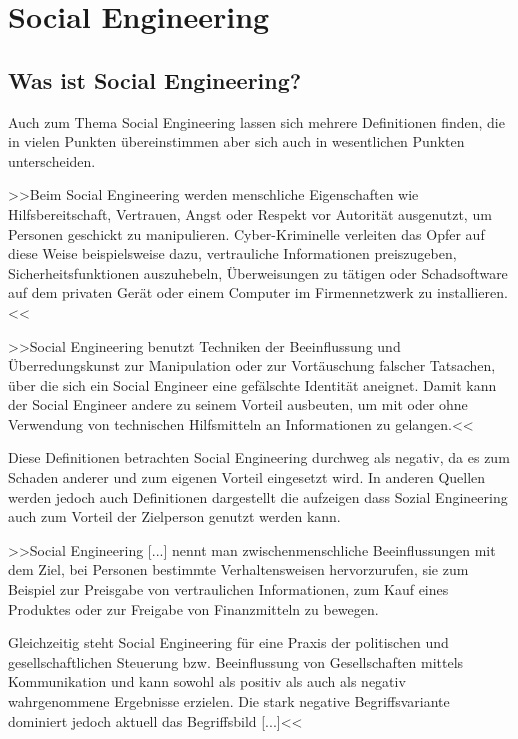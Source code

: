 \chapter{Social Engineering}\label{ch:SocialEngineering}



\section{Was ist Social Engineering?}

Auch zum Thema Social Engineering lassen sich mehrere Definitionen finden, die in vielen Punkten übereinstimmen aber sich auch in wesentlichen Punkten unterscheiden. 

>>Beim Social Engineering werden menschliche Eigenschaften wie Hilfsbereitschaft, Vertrauen, Angst oder Respekt vor Autorität ausgenutzt, um Personen geschickt zu manipulieren. Cyber-Kriminelle verleiten das Opfer auf diese Weise beispielsweise dazu, vertrauliche Informationen preiszugeben, Sicherheitsfunktionen auszuhebeln, Überweisungen zu tätigen oder Schadsoftware auf dem privaten Gerät oder einem Computer im Firmennetzwerk zu installieren.<<\cite{bsi}

>>Social Engineering benutzt Techniken der Beeinflussung und Überredungskunst zur Manipulation oder zur Vortäuschung falscher Tatsachen, über die sich ein Social Engineer eine gefälschte Identität aneignet. Damit kann der Social Engineer andere zu seinem Vorteil ausbeuten, um mit oder ohne Verwendung von technischen Hilfsmitteln an Informationen zu gelangen.<<\cite{mitn}

Diese Definitionen betrachten Social Engineering durchweg als negativ, da es zum Schaden anderer und zum eigenen Vorteil eingesetzt wird. In anderen Quellen werden jedoch auch Definitionen dargestellt die aufzeigen dass Sozial Engineering auch zum Vorteil der Zielperson genutzt werden kann.

>>Social Engineering [...] nennt man zwischenmenschliche Beeinflussungen mit dem Ziel, bei Personen bestimmte Verhaltensweisen hervorzurufen, sie zum Beispiel zur Preisgabe von vertraulichen Informationen, zum Kauf eines Produktes oder zur Freigabe von Finanzmitteln zu bewegen.

Gleichzeitig steht Social Engineering für eine Praxis der politischen und gesellschaftlichen Steuerung bzw. Beeinflussung von Gesellschaften mittels Kommunikation und kann sowohl als positiv als auch als negativ wahrgenommene Ergebnisse erzielen. Die stark negative Begriffsvariante dominiert jedoch aktuell das Begriffsbild [...]<<\cite{wiki}

